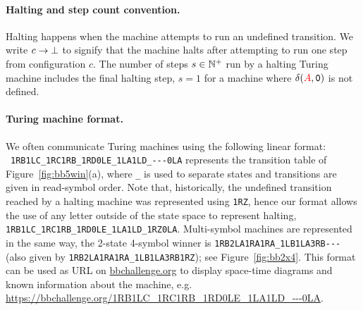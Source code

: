\vspace{-1ex}
\paragraph{Halting and step count convention.} Halting happens when the machine attempts to run an undefined transition. We write $c \to \bot$ to signify that the machine halts after attempting to run one step from configuration $c$. The number of steps $s\in \mathbb{N}^+$ run by a halting Turing machine includes the final halting step, \eg $s = 1$ for a machine where $\delta(\stateA,\symbolzero)$ is not defined.



\vspace{-1ex}
\paragraph*{Turing machine format.} We often communicate Turing machines using the following linear format: \\ \verb|1RB1LC_1RC1RB_1RD0LE_1LA1LD_---0LA| represents the transition table of Figure~\ref{fig:bb5win}(a), where \texttt{\_} is used to separate states and transitions are given in read-symbol order. Note that, historically, the undefined transition reached by a halting machine was represented using \texttt{1RZ}, hence our format allows the use of any letter outside of the state space to represent halting, \eg \texttt{1RB1LC\_1RC1RB\_1RD0LE\_1LA1LD\_1RZ0LA}. Multi-symbol machines are represented in the same way, \eg the 2-state 4-symbol \BBfull winner is \verb|1RB2LA1RA1RA_1LB1LA3RB---| (also given by \texttt{1RB2LA1RA1RA\_1LB1LA3RB1RZ}); see Figure~\ref{fig:bb2x4}. This format can be used as URL on \url{bbchallenge.org} to display space-time diagrams and known information about the machine, e.g. \url{https://bbchallenge.org/1RB1LC\_1RC1RB\_1RD0LE\_1LA1LD\_---0LA}.

